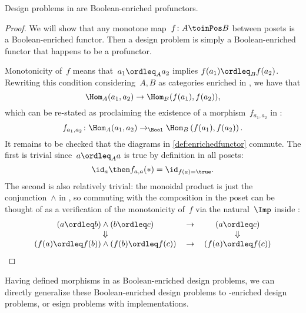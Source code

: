 \begin{proposition}
    Design problems in \DP are Boolean-enriched profunctors.
\end{proposition}
\begin{proof}
    We will show that any monotone map~$f\colon A \toinPos B$ between posets is a Boolean-enriched functor.
    Then a design problem is simply a Boolean-enriched functor that happens to be a profunctor.

    Monotonicity of~$f$ means that~$a_1 \ordleq_A a_2$ implies $f(a_1) \ordleq_B f(a_2)$.
    Rewriting this condition considering~$A, B$ as categories enriched in \Bool, we have that
    \begin{equation*}
        \Hom_A(a_1, a_2) \to \Hom_B(f(a_1), f(a_2)),
    \end{equation*}
    which can be re-stated as proclaiming the existence of a morphism~$f_{a_1, a_2}$ in \Bool:
    \begin{equation*}
        f_{a_1, a_2} \colon \Hom_A(a_1, a_2) \to_{\Bool} \Hom_B\left(f(a_1), f(a_2)\right).
    \end{equation*}
    It remains to be checked that the diagrams in \cref{def:enrichedfunctor} commute.
    The first is trivial since~$a \ordleq_A a$ is true by definition in all posets:
    \begin{equation*}
        \id_{a} \then f_{a,a} (\ast) = \id_{f(a) = \true}.
    \end{equation*}
    The second is also relatively trivial: the monoidal product is just the conjunction~$\wedge$ in \Bool, so commuting with the composition in the poset can be thought of as a verification of the monotonicity of~$f$ via the natural~$\Imp$ inside \Bool:
    \begin{equation*}
        \begin{tabular}{ccc}
            $(a \ordleq b) \wedge (b \ordleq c)$             & $\to$ & $(a \ordleq c)$       \\
            $\Downarrow$                                     &       & $\Downarrow$          \\
            $(f(a) \ordleq f(b)) \wedge (f(b) \ordleq f(c))$ & $\to$ & $(f(a) \ordleq f(c))$
        \end{tabular}
    \end{equation*}
\end{proof}

Having defined morphisms in \DP as Boolean-enriched design problems, we can directly generalize these Boolean-enriched design problems to \Set-enriched design problems, or esign problems with implementations.

